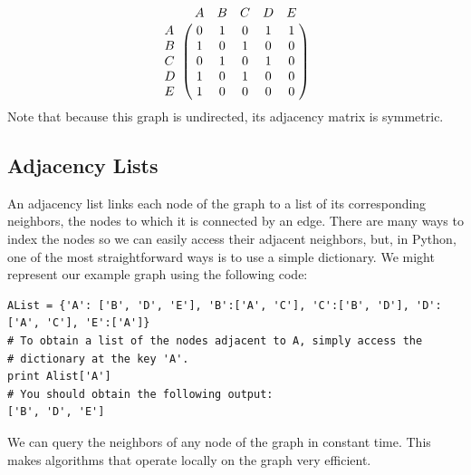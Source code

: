 \[
\bordermatrix{\hspace{.4cm}&A&B&C&D&E\cr
                A&0 & 1 & 0 & 1 & 1\cr
                B& 1 & 0 & 1 & 0 & 0\cr
                C& 0 & 1 & 0 & 1 & 0\cr
                D& 1 & 0 & 1 & 0 & 0\cr
                E& 1 & 0 & 0 & 0 & 0}\]
Note that because this graph is undirected, its adjacency matrix is symmetric.

\subsection*{Adjacency Lists}
An adjacency list links each node of the graph to a list of its corresponding neighbors, the nodes to which it is connected by an edge.
There are many ways to index the nodes so we can easily access their adjacent neighbors, but, in Python, one of the most straightforward ways is to use a simple dictionary.
We might represent our example graph using the following code:
\begin{lstlisting}
AList = {'A': ['B', 'D', 'E'], 'B':['A', 'C'], 'C':['B', 'D'], 'D':['A', 'C'], 'E':['A']}
# To obtain a list of the nodes adjacent to A, simply access the
# dictionary at the key 'A'.
print Alist['A']
# You should obtain the following output:
['B', 'D', 'E']
\end{lstlisting}
We can query the neighbors of any node of the graph in constant time.
This makes algorithms that operate locally on the graph very efficient.

